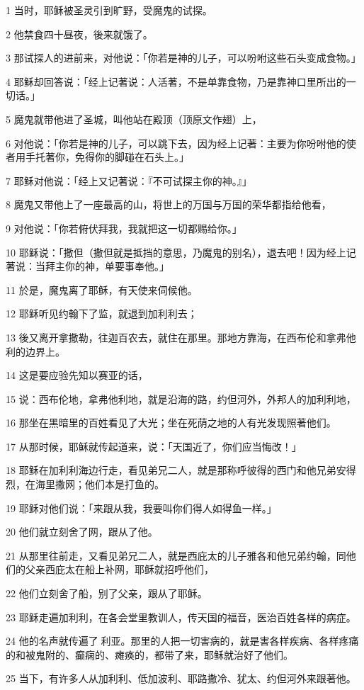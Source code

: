 \par 1 当时，耶稣被圣灵引到旷野，受魔鬼的试探。
\par 2 他禁食四十昼夜，後来就饿了。
\par 3 那试探人的进前来，对他说：「你若是神的儿子，可以吩咐这些石头变成食物。」
\par 4 耶稣却回答说：「经上记著说：人活著，不是单靠食物，乃是靠神口里所出的一切话。」
\par 5 魔鬼就带他进了圣城，叫他站在殿顶（顶原文作翅）上，
\par 6 对他说：「你若是神的儿子，可以跳下去，因为经上记著：主要为你吩咐他的使者用手托著你，免得你的脚碰在石头上。」
\par 7 耶稣对他说：「经上又记著说：『不可试探主你的神。』」
\par 8 魔鬼又带他上了一座最高的山，将世上的万国与万国的荣华都指给他看，
\par 9 对他说：「你若俯伏拜我，我就把这一切都赐给你。」
\par 10 耶稣说：「撒但（撒但就是抵挡的意思，乃魔鬼的别名），退去吧！因为经上记著说：当拜主你的神，单要事奉他。」
\par 11 於是，魔鬼离了耶稣，有天使来伺候他。
\par 12 耶稣听见约翰下了监，就退到加利利去；
\par 13 後又离开拿撒勒，往迦百农去，就住在那里。那地方靠海，在西布伦和拿弗他利的边界上。
\par 14 这是要应验先知以赛亚的话，
\par 15 说：西布伦地，拿弗他利地，就是沿海的路，约但河外，外邦人的加利利地，
\par 16 那坐在黑暗里的百姓看见了大光；坐在死荫之地的人有光发现照著他们。
\par 17 从那时候，耶稣就传起道来，说：「天国近了，你们应当悔改！」
\par 18 耶稣在加利利海边行走，看见弟兄二人，就是那称呼彼得的西门和他兄弟安得烈，在海里撒网；他们本是打鱼的。
\par 19 耶稣对他们说：「来跟从我，我要叫你们得人如得鱼一样。」
\par 20 他们就立刻舍了网，跟从了他。
\par 21 从那里往前走，又看见弟兄二人，就是西庇太的儿子雅各和他兄弟约翰，同他们的父亲西庇太在船上补网，耶稣就招呼他们，
\par 22 他们立刻舍了船，别了父亲，跟从了耶稣。
\par 23 耶稣走遍加利利，在各会堂里教训人，传天国的福音，医治百姓各样的病症。
\par 24 他的名声就传遍了利亚。那里的人把一切害病的，就是害各样疾病、各样疼痛的和被鬼附的、癫痫的、瘫痪的，都带了来，耶稣就治好了他们。
\par 25 当下，有许多人从加利利、低加波利、耶路撒冷、犹太、约但河外来跟著他。

